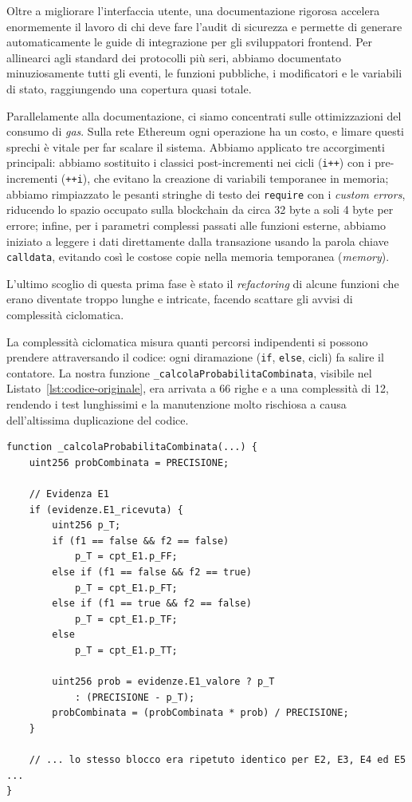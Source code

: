 Oltre a migliorare l'interfaccia utente, una documentazione rigorosa accelera enormemente il lavoro di chi deve fare l'audit di sicurezza e permette di generare automaticamente le guide di integrazione per gli sviluppatori frontend. Per allinearci agli standard dei protocolli più seri, abbiamo documentato minuziosamente tutti gli eventi, le funzioni pubbliche, i modificatori e le variabili di stato, raggiungendo una copertura quasi totale.



Parallelamente alla documentazione, ci siamo concentrati sulle ottimizzazioni del consumo di \textit{gas}. Sulla rete Ethereum ogni operazione ha un costo, e limare questi sprechi è vitale per far scalare il sistema. Abbiamo applicato tre accorgimenti principali: 
abbiamo sostituito i classici post-incrementi nei cicli (\texttt{i++}) con i pre-incrementi (\texttt{++i}), che evitano la creazione di variabili temporanee in memoria; 
abbiamo rimpiazzato le pesanti stringhe di testo dei \texttt{require} con i \textit{custom errors}, riducendo lo spazio occupato sulla blockchain da circa 32 byte a soli 4 byte per errore; 
infine, per i parametri complessi passati alle funzioni esterne, abbiamo iniziato a leggere i dati direttamente dalla transazione usando la parola chiave \texttt{calldata}, evitando così le costose copie nella memoria temporanea (\textit{memory}).

L'ultimo scoglio di questa prima fase è stato il \textit{refactoring} di alcune funzioni che erano diventate troppo lunghe e intricate, facendo scattare gli avvisi di complessità ciclomatica. 



La complessità ciclomatica misura quanti percorsi indipendenti si possono prendere attraversando il codice: ogni diramazione (\texttt{if}, \texttt{else}, cicli) fa salire il contatore. La nostra funzione \texttt{\_calcolaProbabilitaCombinata}, visibile nel Listato~\ref{lst:codice-originale}, era arrivata a 66 righe e a una complessità di 12, rendendo i test lunghissimi e la manutenzione molto rischiosa a causa dell'altissima duplicazione del codice.

\begin{lstlisting}[language=Solidity, caption={La funzione originale \texttt{\_calcolaProbabilitaCombinata} prima della pulizia}, label=lst:codice-originale]
function _calcolaProbabilitaCombinata(...) {
    uint256 probCombinata = PRECISIONE;
    
    // Evidenza E1
    if (evidenze.E1_ricevuta) {
        uint256 p_T;
        if (f1 == false && f2 == false) 
            p_T = cpt_E1.p_FF;
        else if (f1 == false && f2 == true) 
            p_T = cpt_E1.p_FT;
        else if (f1 == true && f2 == false) 
            p_T = cpt_E1.p_TF;
        else 
            p_T = cpt_E1.p_TT;
        
        uint256 prob = evidenze.E1_valore ? p_T 
            : (PRECISIONE - p_T);
        probCombinata = (probCombinata * prob) / PRECISIONE;
    }
    
    // ... lo stesso blocco era ripetuto identico per E2, E3, E4 ed E5 ...
}
\end{lstlisting}

